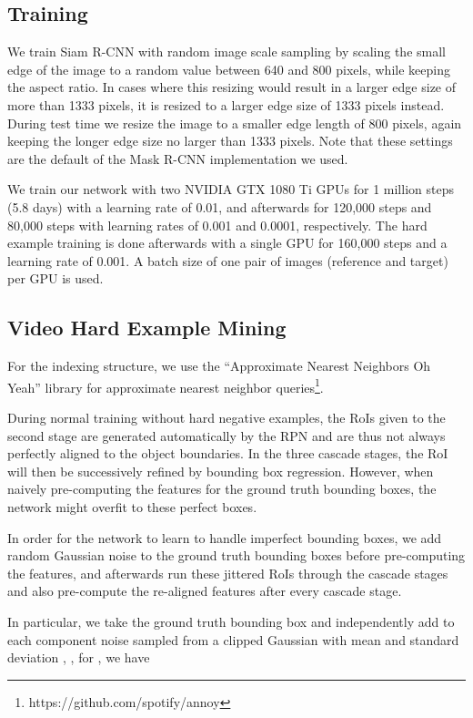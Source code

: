 \documentclass[10pt,twocolumn,letterpaper]{article}
\newcommand{\PAR}[1]{\vskip1pt \noindent {\bf #1~}}
\begin{document}
\subsection{Training}

We train Siam R-CNN with random image scale sampling by scaling the small edge of the image to a random value between 640 and 800 pixels, while keeping the aspect ratio. In cases where this resizing would result in a larger edge size of more than 1333 pixels, it is resized to a larger edge size of 1333 pixels instead. During test time we resize the image to a smaller edge length of 800 pixels, again keeping the longer edge size no larger than 1333 pixels. Note that these settings are the default of the Mask R-CNN implementation we used.

We train our network with two NVIDIA GTX 1080 Ti GPUs for 1 million steps (5.8 days) with a learning rate of 0.01, and afterwards for 120,000 steps and 80,000 steps with learning rates of 0.001 and 0.0001, respectively. The hard example training is done afterwards with a single GPU for 160,000 steps and a learning rate of 0.001. A batch size of one pair of images (reference and target) per GPU is used.

\subsection{Video Hard Example Mining}

 
\PAR{Index Structure.} For the indexing structure, we use the ``Approximate Nearest Neighbors Oh Yeah'' library for approximate nearest neighbor queries\footnote{https://github.com/spotify/annoy}.


\PAR{Feature Pre-computation.}
During normal training without hard negative examples, the RoIs given to the second stage are generated automatically by the RPN and are thus not always perfectly aligned to the object boundaries. In the three cascade stages, the RoI will then be successively refined by bounding box regression. However, when naively pre-computing the features for the ground truth bounding boxes, the network might overfit to these perfect boxes.

In order for the network to learn to handle imperfect bounding boxes, we add random Gaussian noise to the ground truth bounding boxes before pre-computing the features, and afterwards run these  jittered RoIs through the cascade stages and also pre-compute the re-aligned features after every cascade stage.

In particular, we take the ground truth bounding box  and independently add to each component noise sampled from a clipped Gaussian with mean  and standard deviation , \ie, for , we have
\end{document}
